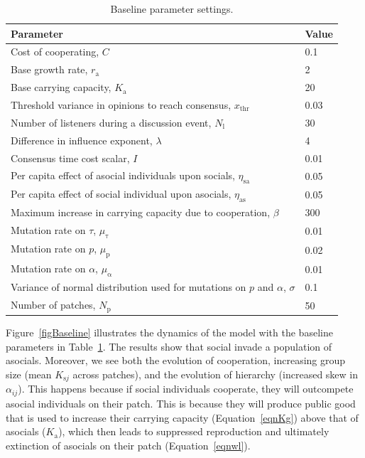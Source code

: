 \documentclass{rstb}
\begin{document}
\begin{linenumbers}
\begin{table}[!p]
	\centering
	\caption{Baseline parameter settings.}
		\begin{tabular}{|p{4.5in}|l|}
		\hline
		\textbf{Parameter} & \textbf{Value} \\ \hline
		Cost of cooperating, $C$ & 0.1 \\ \hline
		Base growth rate, $r_{\mathrm{a}}$ & 2 \\ \hline
            Base carrying capacity, $K_{\mathrm{a}}$ & 20 \\ \hline
            Threshold variance in opinions to reach consensus,  $x_\mathrm{thr}$ & 0.03 \\ \hline
            Number of listeners during a discussion event, $N_\mathrm{l}$ & 30 \\ \hline
            Difference in influence exponent, $\lambda$ & 4 \\ \hline
            Consensus time cost scalar, $I$ & 0.01 \\ \hline
		Per capita effect of asocial individuals upon socials, $\eta_{\mathrm{sa}}$ & 0.05 \\ \hline
		Per capita effect of social individual upon asocials, $\eta_{\mathrm{as}}$ & 0.05 \\ \hline
		Maximum increase in carrying capacity due to cooperation, $\beta$ & 300 \\ \hline
		Mutation rate on $\tau$, $\mu_\mathrm{\tau}$ & 0.01 \\ \hline
            Mutation rate on $p$, $\mu_\mathrm{p}$ & 0.02 \\ \hline
            Mutation rate on $\alpha$, $\mu_\mathrm{\alpha}$ & 0.01 \\ \hline
		Variance of normal distribution used for mutations on $p$ and $\alpha$, $\sigma$ & 0.1 \\ \hline
		Number of patches, $N_\mathrm{p}$ & 50 \\ \hline	
		\end{tabular}
	
	\label{tabModParams}
\end{table} 

Figure~\ref{figBaseline} illustrates the dynamics of the model with the baseline parameters in Table~\ref{tabModParams}. The results show that social invade a population of asocials. Moreover, we see both the evolution of cooperation, increasing group size (mean $K_{\mathrm{s}j}$ across patches), and the evolution of hierarchy (increased skew in $\alpha_{ij}$). This happens because if social individuals cooperate, they will outcompete asocial individuals on their patch. This is because they will produce public good that is used to increase their carrying capacity (Equation~\ref{eqnKg}) above that of asocials ($K_\mathrm{a}$), which then leads to suppressed reproduction and ultimately extinction of asocials on their patch (Equation~\ref{eqnwl}). 


\end{linenumbers}
\end{document}
